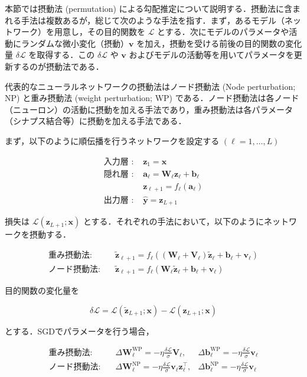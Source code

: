 \documentclass[11pt,a4paper]{jsarticle}
\begin{document}
本節では摂動法 (permutation) による勾配推定について説明する．摂動法に含まれる手法は複数あるが，総じて次のような手法を指す．まず，あるモデル（ネットワーク）を用意し，その目的関数を $\mathcal{L}$ とする．次にモデルのパラメータや活動にランダムな微小変化（摂動）$\mathbf{v}$ を加え，摂動を受ける前後の目的関数の変化量 $\delta \mathcal{L}$ を取得する．この $\delta \mathcal{L}$ や $\mathbf{v}$ およびモデルの活動等を用いてパラメータを更新するのが摂動法である．

代表的なニューラルネットワークの摂動法はノード摂動法 (Node perturbation; NP) と重み摂動法 (weight perturbation; WP) である．ノード摂動法は各ノード（ニューロン）の活動に摂動を加える手法であり，重み摂動法は各パラメータ（シナプス結合等）に摂動を加える手法である．

まず，以下のように順伝播を行うネットワークを設定する $(\ell=1,\ldots,L)$

\begin{align}
\text{入力層 : }&\mathbf{z}_1=\mathbf{x}\\
\text{隠れ層 : }&\mathbf{a}_\ell=\mathbf{W}_\ell \mathbf{z}_\ell +\mathbf{b}_\ell\\
&\mathbf{z}_{\ell+1}=f_\ell\left(\mathbf{a}_\ell\right)\\
\text{出力層 : }&\hat{\mathbf{y}}=\mathbf{z}_{L+1}
\end{align}

損失は $\mathcal{L}(\mathbf{z}_{L+1}; \mathbf{x})$ とする．それぞれの手法において，以下のようにネットワークを摂動する．

\begin{align}
\text{重み摂動法:}\quad &\tilde{\mathbf{z}}_{\ell+1}=f_\ell\left((\mathbf{W}_\ell+\mathbf{V}_\ell) \tilde{\mathbf{z}}_\ell +\mathbf{b}_\ell +\mathbf{v}_\ell\right)\\
\text{ノード摂動法:}\quad &\tilde{\mathbf{z}}_{\ell+1}=f_\ell\left(\mathbf{W}_\ell \tilde{\mathbf{z}}_\ell +\mathbf{b}_\ell+\mathbf{v}_\ell \right)
\end{align}

目的関数の変化量を

\begin{equation}
\delta \mathcal{L}=\mathcal{L}(\tilde{\mathbf{z}}_{L+1}; \mathbf{x})-\mathcal{L}(\mathbf{z}_{L+1}; \mathbf{x})
\end{equation}

とする．SGDでパラメータを行う場合，

\begin{align}
\text{重み摂動法:}\quad &\Delta \mathbf{W}_\ell^{\mathrm{WP}}=-\eta \frac{\delta \mathcal{L}}{\sigma}\mathbf{V}_\ell, &\Delta \mathbf{b}_\ell^{\mathrm{WP}}=-\eta \frac{\delta \mathcal{L}}{\sigma}\mathbf{v}_\ell\\
\text{ノード摂動法:}\quad &\Delta \mathbf{W}_\ell^{\mathrm{NP}}=- \eta  \frac{\delta \mathcal{L}}{\sigma} \mathbf{v}_\ell \mathbf{z}_{\ell}^\top, &\Delta \mathbf{b}_\ell^{\mathrm{NP}} =- \eta  \frac{\delta \mathcal{L}}{\sigma} \mathbf{v}_\ell
\end{align}
\end{document}
